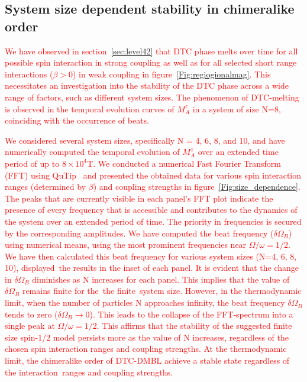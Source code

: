 \documentclass[12pt]{iopart}
\newcommand{\red}[1]{\textcolor{red}{#1}}
\begin{document}
\subsection{\label{sec:level43} System size dependent stability in chimeralike order}
\red{We have observed in section~\ref{sec:level42} that DTC phase melts over time for all possible spin interaction in strong coupling as well as for all selected short range interactions ($\beta > 0$) in weak coupling in figure~\ref{Fig:regiogionalmag}. This necessitates  an investigation into the stability of the DTC phase across a wide range of factors, such as different system sizes. The phenomenon of DTC-melting is observed in the temporal evolution curves of $M^z_A$ in a system of size N=8, coinciding with the occurrence of beats. }

\red{We considered several system sizes, specifically N = 4, 6, 8, and 10, and have numerically computed the temporal evolution of $M^z_A$ over an extended time period of up to $8\times10^4$T. We conducted a numerical Fast Fourier Transform (FFT) using QuTip~\cite{Johansson2013} and presented the obtained data for various spin interaction ranges (determined by $\beta$) and coupling strengths in figure~\ref{Fig:size_dependence}. The peaks that are currently visible in each panel's FFT plot indicate the presence of every frequency that is accessible and contributes to the dynamics of the system over an extended period of time. The priority in frequencies is secured by the corresponding amplitudes. We have computed the beat frequency ($\delta\Omega_B$) using numerical means, using the most prominent frequencies near $\Omega/\omega = 1/2$. We have then calculated this beat frequency for various system sizes (N=4, 6, 8, 10), displayed the results in the inset of each panel. It is evident that the change in $\delta\Omega_B$ diminishes as N increases for each panel. This implies that the value of $\delta\Omega_B$ remains finite for the the finite system size. However, in the thermodynamic limit, when the number of particles N approaches infinity, the beat frequency $\delta\Omega_B$ tends to zero ($\delta\Omega_B\rightarrow 0$). This leads to the collapse of the FFT-spectrum into a single peak at $\Omega/\omega = 1/2$. This affirms that the stability of the suggested finite size spin-1/2 model persists more as the value of N increases, regardless of the chosen spin interaction ranges and coupling strengths. At the thermodynamic limit, the chimeralike order of DTC-DMBL achieve a stable state regardless of the interaction ranges and coupling strengths.}
\end{document}
